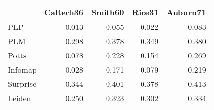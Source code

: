 \begin{tabular}{lrrrr}
\toprule
{} & Caltech36 & Smith60 & Rice31 & Auburn71 \\
\midrule
PLP      &     0.013 &   0.055 &  0.022 &    0.083 \\
PLM      &     0.298 &   0.378 &  0.349 &    0.380 \\
Potts    &     0.078 &   0.228 &  0.154 &    0.269 \\
Infomap  &     0.028 &   0.171 &  0.079 &    0.219 \\
Surprise &     0.344 &   0.401 &  0.378 &    0.413 \\
Leiden   &     0.250 &   0.323 &  0.302 &    0.334 \\
\bottomrule
\end{tabular}
